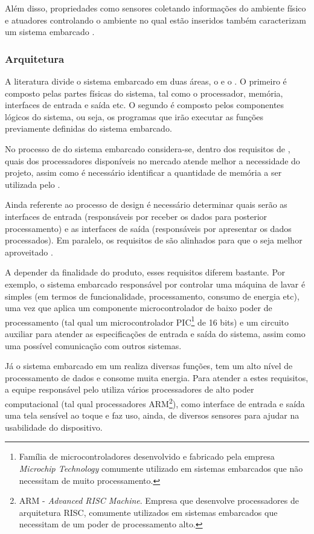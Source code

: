 Além disso, propriedades como sensores coletando informações do ambiente
físico e atuadores controlando o ambiente no qual estão inseridos também
caracterizam um sistema embarcado \cite{marwedel2010embedded}.

\subsubsection{Arquitetura}\label{subsubsec:arquitetura}

A literatura divide o sistema embarcado em duas áreas, o \hardware[] e o 
\software. O primeiro é composto pelas partes físicas do sistema, 
tal como o processador, memória, interfaces de entrada e saída etc. O segundo é
composto pelos componentes lógicos do sistema, ou seja, os programas que 
irão executar as funções previamente definidas do sistema embarcado.

No processo de \design[] do sistema embarcado considera-se, dentro dos
requisitos de \hardware, quais dos processadores disponíveis no mercado atende
melhor a necessidade do projeto, assim como é necessário identificar a
quantidade de memória a ser utilizada pelo \software[]. 

Ainda referente ao processo de design é necessário determinar quais serão as
interfaces de entrada (responsáveis por receber os dados para posterior
processamento) e as interfaces de saída (responsáveis por apresentar os dados
processados). Em paralelo, os requisitos de \software[] são alinhados para que o
\hardware[] seja melhor aproveitado \cite{wolf2012computers}.

A depender da finalidade do produto, esses requisitos diferem bastante. Por
exemplo, o sistema embarcado responsável por controlar uma máquina de lavar é
simples (em termos de funcionalidade, processamento, consumo de energia etc),
uma vez que aplica um componente microcontrolador de baixo poder de
processamento (tal qual um microcontrolador PIC\footnote{Família de
microcontroladores desenvolvido e fabricado pela empresa \textit{Microchip
Technology} comumente utilizado em sistemas embarcados que não necessitam de
muito processamento.} de 16 bits) e um circuito auxiliar para atender as
especificações de entrada e saída do sistema, assim como uma possível
comunicação com outros sistemas.

Já o sistema embarcado em um \smartphone[] realiza diversas funções, tem um
alto nível de processamento de dados e consome muita energia. Para atender a
estes requisitos, a equipe responsável pelo \design[] utiliza vários
processadores de alto poder computacional (tal qual processadores
ARM\footnote{ARM - \textit{Advanced RISC Machine}. Empresa que desenvolve 
processadores de arquitetura RISC, comumente utilizados em sistemas
embarcados que necessitam de um poder de processamento alto.}), como interface
de entrada e saída uma tela sensível ao toque e faz uso, ainda, de diversos
sensores para ajudar na usabilidade do dispositivo.

